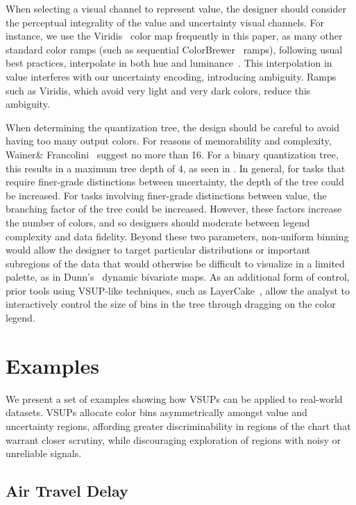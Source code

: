 When selecting a visual channel to represent value, the designer should consider the perceptual integrality of the value and uncertainty visual channels. For instance, we use the Viridis~\cite{viridis} color map frequently in this paper, as many other standard color ramps (such as sequential ColorBrewer~\cite{harrower2003colorbrewer} ramps), following usual best practices, interpolate in both hue and luminance~\cite{ware1988color}. This interpolation in value interferes with our uncertainty encoding, introducing ambiguity. Ramps such as Viridis, which avoid very light and very dark colors, reduce this ambiguity.

When determining the quantization tree, the design should be careful to avoid having too many output colors. For reasons of memorability and complexity, Wainer\& Francolini~\cite{wainer1980empirical} suggest no more than 16. For a binary quantization tree, this results in a maximum tree depth of 4, as seen in . In general, for tasks that require finer-grade distinctions between uncertainty, the depth of the tree could be increased. For tasks involving finer-grade distinctions between value, the branching factor of the tree could be increased. However, these factors increase the number of colors, and so designers should moderate between legend complexity and data fidelity. Beyond these two parameters, non-uniform binning would allow the designer to target particular distributions or important subregions of the data that would otherwise be difficult to visualize in a limited palette, as in Dunn's~\cite{dunn1989dynamic} dynamic bivariate maps. As an additional form of control, prior tools using VSUP-like techniques, such as LayerCake~\cite{correll2015layercake}, allow the analyst to interactively control the size of bins in the tree through dragging on the color legend.

\section{Examples}

We present a set of examples showing how VSUPs can be applied to real-world datasets. VSUPs allocate color bins asymmetrically amongst value and uncertainty regions, affording greater discriminability in regions of the chart that warrant closer scrutiny, while discouraging exploration of regions with noisy or unreliable signals.


\subsection{Air Travel Delay}

